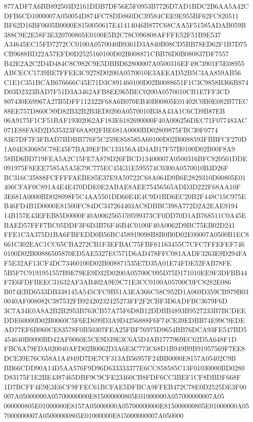 \documentclass[UTF8,fontset=fandol,zihao=-4,a4paper]{ctexart}
\begin{document}
{{877ADF7A6BB892503D2161DDB7DF56E5F0953B7726D7AD1BDC2B6AA5A42CDFB6CD1000007A050054D874FC78DD860DC39584CEE9E955BF62FC820511
BF62D16BF0605B0000E8150050617E41414046B877C68CAA5F51585ADAB059B388C9E2E58F3E320700805E0100E5B2C78C096808AFFFE52F51B9E537
A34645EC15FD7272CC0100A0570040B9361D3A840B08CD5BB78ED62F1B7D75CB9688BD22A57EFD0D2525160100D02B008871CBB76D0B080837DF7557
B42E2A2C2D4D484C8C982C9E5DBBD62800007A0500316EF49C3901F5E08955ABCECC1739BE7FFEE3C9278D0200A0570010E3AEEAD52B5C3AA859AB56
C1E1C351BCAB676666C45E71D3C891460100D02B0088651F1C3C9858B366B874D03D2323BAD7F51D3A3462AFB8EE965BEC0200A0570010CB1E7FF3CD
807430E69967A27B5DFF112322F68A6B070EB40B00805E01402C0B0E082B77EC88EE757D860C89D82B32B2B3ED0200A0570010B38A43A1C6CD9B87EB
06A9175F1CF51BAF19302062AF183E6182690000F40A006256DEC71F077483AC071E88FA8D2D535323F68A892FBE681A0000BD02809875FBC30F0774
83E7DF7F3FBAD7BDBB776F5C259E858585A60100D02B0088593FBBFCF270D1A04E830685C78E45F7BA39EFBC133156A4D4AB17F57B0100D02B00F8A9
58BD6BD719FEA5A2C15FE7A878D26FBCD13400007A0500316BFC820501DDE091975F8EEE7585A5A5E79C775EC45E31E595574C0300A0570010B3D26F
BC316C35888FCFFFFAEBE85E37E9A59722C68A064D9B6E2829310D00805E01406CFAF0C891A4E4E470DDE0E2ABAE8AEE75456565ADD3D222F68AA10F
3E681A0000BD028098F5C4AA5501DD60E4E4C9D1BD6EC20B2F448C15C975EB46FD4B1D0000E81500FC84DC347264403AC8DBBC398A772D2A2EAE9194
14B157E43EFEB85D0000F40A0062565159599373CF0DD70D1AB768511C0A45EBAED57FFF7BC05DDF3F6D3B76F46B4C0100F40A0062D9BC75EB02D241
FFE1C3A375D1BA6FBFEDD0B56BC458919098B8B0B0D02E00007A0500B1EC8661C302EAC1CC65CBA272CB1F3EFBAC75FBF61163455C7CFC7FFEFEF746
0100D02B00886505870ED5AE5327EC571D6AD478FFC081AADF3263E9D294FAF5E32AF13CF4DC73460100D02B008871535E7D35A01E74FDE52FAB78FE
5B5F7C9191951557B9E79EE9D32D0200A05700C095D75D171010EE9F3DFBB44F7E6FDFBEEC31632AF3AB402A9E9C71E3CC0100A05700C0FC8282E086
B074EBD6533DB338145A545CFC9B51A3EA366C58C952D1A069D359CB979B030040AF008082C387532FB92420232425273FF2F2CBF3D6ADFBC3679F6D
3C7A34E0A8A2B2B2953B763CB57A75F6D8B12DDBB4893B9527233B7BCDEEDDE60000D02B0060C5F6ED699D3A9D4256888F6F74CE39EDBB74E99C9EDE
AD77EF6B060CE83578F0B50307FEA25FBF76975D9654BB76DCA93FE547BD5454640B0000BD42AF0060E5CE9D39E3C6A5D4AB1777969EC62D5A648F1D
FBC6A79FDA020040AFD02B0062D3A6E3C773C68D1B949B9B91957569F7EE8DCE39E76C658A1A4949D7DE7CF313AB56957F24BB0000E8157A05402C9B
BB66CDD90A14D5AA576F9D96D633333377E6CC858585C13F01030000BD0280D83175F1E2BE4387465DBF9C9CFE23460CB8FDF6CC3BEF1CF8DBDF668F
1D7BCFF4E9E3E6CF9FFEC61BCFAE5DFBCA9FFEB472C78E0D2525DE3F00007A05000000A05700000000E815000000805E01000000A057000000007A05
000000805E01000000E8157A05000000A05700000000E815000000805E01000000A057000000007A05000000805E01000000E815000000007A050000
}}
\end{document}
